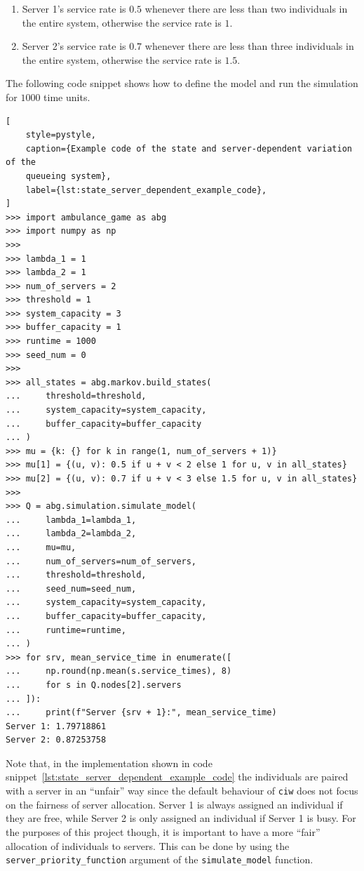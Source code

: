 \begin{enumerate}
    \item Server 1's service rate is \(0.5\) whenever there are less than two
    individuals in the entire system, otherwise the service rate is \(1\).
    \item Server 2's service rate is \(0.7\) whenever there are less than three
    individuals in the entire system, otherwise the service rate is \(1.5\).
\end{enumerate}

The following code snippet shows how to define the model and run the simulation
for \(1000\) time units.

\begin{lstlisting}[
    style=pystyle,
    caption={Example code of the state and server-dependent variation of the
    queueing system},
    label={lst:state_server_dependent_example_code},
]
>>> import ambulance_game as abg
>>> import numpy as np
>>>
>>> lambda_1 = 1
>>> lambda_2 = 1
>>> num_of_servers = 2
>>> threshold = 1
>>> system_capacity = 3
>>> buffer_capacity = 1
>>> runtime = 1000
>>> seed_num = 0
>>> 
>>> all_states = abg.markov.build_states(
...     threshold=threshold,
...     system_capacity=system_capacity,
...     buffer_capacity=buffer_capacity
... )
>>> mu = {k: {} for k in range(1, num_of_servers + 1)}
>>> mu[1] = {(u, v): 0.5 if u + v < 2 else 1 for u, v in all_states}
>>> mu[2] = {(u, v): 0.7 if u + v < 3 else 1.5 for u, v in all_states}
>>>
>>> Q = abg.simulation.simulate_model(
...     lambda_1=lambda_1,
...     lambda_2=lambda_2,
...     mu=mu,
...     num_of_servers=num_of_servers,
...     threshold=threshold,
...     seed_num=seed_num,
...     system_capacity=system_capacity,
...     buffer_capacity=buffer_capacity,
...     runtime=runtime,
... )
>>> for srv, mean_service_time in enumerate([
...     np.round(np.mean(s.service_times), 8)
...     for s in Q.nodes[2].servers
... ]):
...     print(f"Server {srv + 1}:", mean_service_time)
Server 1: 1.79718861
Server 2: 0.87253758

\end{lstlisting}

Note that, in the implementation shown in code
snippet~\ref{lst:state_server_dependent_example_code} the individuals are
paired with a server
in an ``unfair'' way since the default behaviour of \texttt{ciw} does not
focus on the fairness of server allocation.
Server 1 is always assigned an individual if they are free, while Server 2 is
only assigned an individual if Server 1 is busy.
For the purposes of this project though, it is important to have a more
``fair'' allocation of individuals to servers.
This can be done by using the \texttt{server\_priority\_function} argument of
the \texttt{simulate\_model} function.

